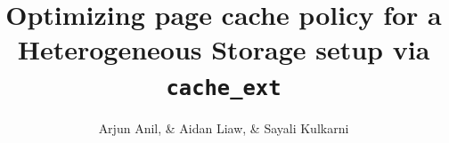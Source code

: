 \documentclass[11pt,sigconf,nonacm]{acmart}
\begin{document}
\title{Optimizing page cache policy for a Heterogeneous Storage setup via \texttt{cache\_ext}}

\author{Arjun Anil, & Aidan Liaw, & Sayali Kulkarni}

\renewcommand{\shortauthors}{Anil et al.}




\maketitle


\end{document}

